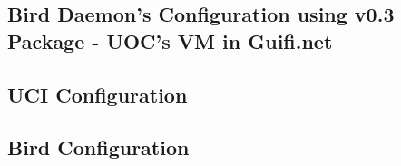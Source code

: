 \newpage
\begin{appendices}
\appendixpage
\noappendicestocpagenum
\addappheadtotoc
{}

\chapter{Bird Daemon's Configuration using v0.3 Package - UOC's VM in Guifi.net}
\label{app:ch:bdcuoc}

\section{UCI Configuration}


\section{Bird Configuration}


\end{appendices}